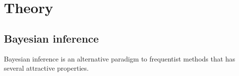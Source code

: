 \documentclass[12pt]{article} %
\begin{document}
		
	

	
	
	
	

	
	
	
%	

	\section{Theory}	
	\subsection{Bayesian inference}	
	Bayesian inference is an alternative paradigm to frequentist methods that has several attractive properties.
	
\end{document}
